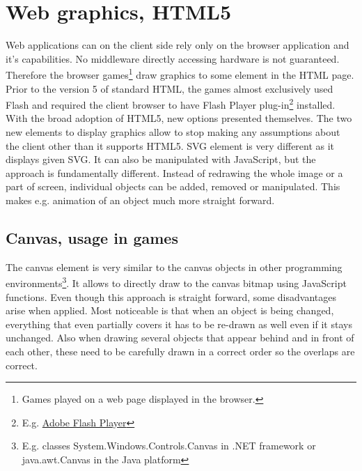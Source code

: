 \documentclass[11pt,oneside, final]{fithesis2}
\begin{document}
\section{Web graphics, HTML5}
Web applications can on the client side rely only on the browser application and it's capabilities. No middleware directly accessing hardware is not guaranteed. Therefore the browser games\footnote{Games played on a web page displayed in the browser.} draw graphics to some element in the HTML page. Prior to the version 5 of standard HTML, the games almost exclusively used Flash\cite{} and required the client browser to have Flash Player plug-in\footnote{E.g. \href{https://get2.adobe.com/cz/flashplayer/}{Adobe Flash Player}} installed. With the broad adoption of HTML5, new options presented themselves. The two new elements to display graphics allow to stop making any assumptions about the client other than it supports HTML5. SVG element is very different as it displays given SVG. It can also be manipulated with JavaScript, but the approach is fundamentally different. Instead of redrawing the whole image or a part of screen, individual objects can be added, removed or manipulated. This makes e.g. animation of an object much more straight forward.

\subsection{Canvas, usage in games}
The canvas element is very similar to the canvas objects in other programming environments\footnote{E.g. classes System.Windows.Controls.Canvas in .NET framework\cite{net_canvas} or java.awt.Canvas in the Java platform\cite{java_canvas}}. It allows to directly draw to the canvas bitmap using JavaScript functions. Even though this approach is straight forward, some disadvantages arise when applied. Most noticeable is that when an object is being changed, everything that even partially covers it has to be re-drawn as well even if it stays unchanged. Also when drawing several objects that appear behind and in front of each other, these need to be carefully drawn in a correct order so the overlaps are correct.
\end{document}
